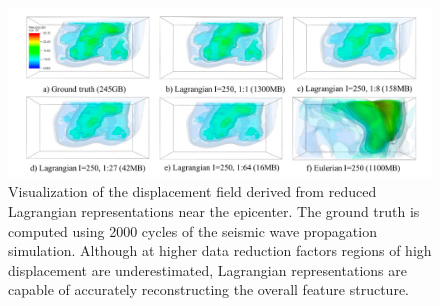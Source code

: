 \begin{figure}[!t]
\centering
\includegraphics[width=\linewidth, trim={1cm, 0cm, 0.9cm, 0cm}, clip]{Images/sw4_figure_small.pdf}
\vspace{-2mm}
\caption{Visualization of the displacement field derived from reduced Lagrangian representations near the epicenter. The ground truth is computed using 2000 cycles of the seismic wave propagation simulation. Although at higher data reduction factors regions of high displacement are underestimated, Lagrangian representations are capable of accurately reconstructing the overall feature structure.} 
\vspace{-5mm}
\label{fig:sw4_figure}
\end{figure}
